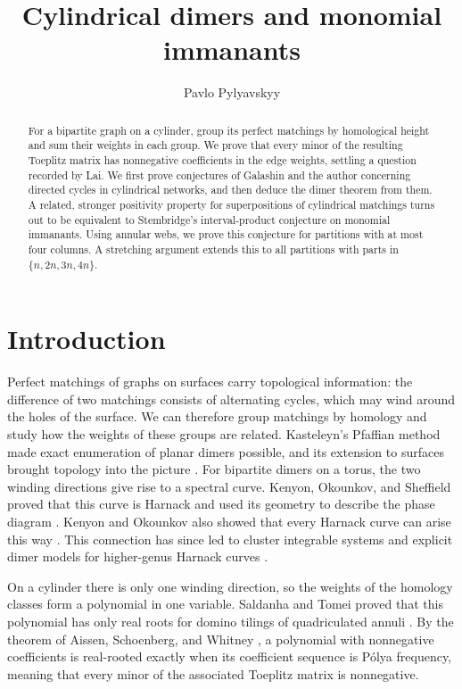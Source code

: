 \documentclass[11pt]{article}
\title{Cylindrical dimers and monomial immanants}
\author{Pavlo Pylyavskyy}
\date{}
\theoremstyle{definition}
\theoremstyle{remark}
\begin{document}
\maketitle


\begin{abstract}
For a bipartite graph on a cylinder, group its perfect matchings by homological height and sum their weights in each group. We prove that every minor of the resulting Toeplitz matrix has nonnegative coefficients in the edge weights, settling a question recorded by Lai. We first prove conjectures of Galashin and the author concerning directed cycles in cylindrical networks, and then deduce the dimer theorem from them. A related, stronger positivity property for superpositions of cylindrical matchings turns out to be equivalent to Stembridge's interval-product conjecture on monomial immanants. Using annular webs, we prove this conjecture for partitions with at most four columns. A stretching argument extends this to all partitions with parts in $\{n,2n,3n,4n\}$.
\end{abstract}







\section{Introduction}


Perfect matchings of graphs on surfaces carry
topological information: the difference of two
matchings consists of alternating cycles, which
may wind around the holes of the surface.
We can therefore group matchings by homology
and study how the weights of these groups are
related. Kasteleyn's Pfaffian method made exact
enumeration of planar dimers possible, and its
extension to surfaces brought topology into
the picture \cite{Kasteleyn63,CimRes}.
For bipartite dimers on a torus, the two winding
directions give rise to a spectral curve.
Kenyon, Okounkov, and Sheffield proved that
this curve is Harnack and used its geometry
to describe the phase diagram \cite{KOS}.
Kenyon and Okounkov also showed that every
Harnack curve can arise this way \cite{KO}.
This connection has since led to cluster
integrable systems and explicit dimer models
for higher-genus Harnack curves
\cite{GonKen,BCdT}.



On a cylinder there is only one winding direction,
so the weights of the homology classes form a
polynomial in one variable. Saldanha and Tomei
proved that this polynomial has only real roots
for domino tilings of quadriculated annuli
\cite{ST}. By the theorem of Aissen, Schoenberg,
and Whitney \cite{ASW}, a polynomial with
nonnegative coefficients is real-rooted exactly
when its coefficient sequence is P\'olya frequency,
meaning that every minor of the associated
Toeplitz matrix is nonnegative.
\end{document}
